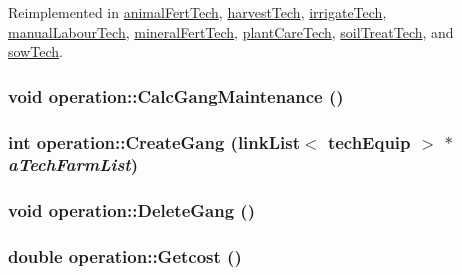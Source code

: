 Reimplemented in \hyperlink{classanimal_fert_tech_a44124a413ec4871546323878c2782380}{animalFertTech}, \hyperlink{classharvest_tech_a76ab6bbf21dabdf2dccc36bb5a632f9e}{harvestTech}, \hyperlink{classirrigate_tech_a936cb4d45c7ae68deaa04ce5d9397dbe}{irrigateTech}, \hyperlink{classmanual_labour_tech_a4947c755580db30ddaf817a7f7238600}{manualLabourTech}, \hyperlink{classmineral_fert_tech_a60aff267f8d7906833524bbd0edcc39b}{mineralFertTech}, \hyperlink{classplant_care_tech_a3d5338d71d9ef7b80859ac1576084d7f}{plantCareTech}, \hyperlink{classsoil_treat_tech_a8cb69be7b91ff19c7ced98d10d8a3ff5}{soilTreatTech}, and \hyperlink{classsow_tech_aec37925c5aa7d1ea82df758921c8fdc3}{sowTech}.\hypertarget{classoperation_a073d712fe9226371dc494e21312eb5c9}{
\subsubsection[{CalcGangMaintenance}]{\setlength{\rightskip}{0pt plus 5cm}void operation::CalcGangMaintenance ()}}
\label{classoperation_a073d712fe9226371dc494e21312eb5c9}
\hypertarget{classoperation_a43f0d435816474a618d0167b56a575c4}{
\subsubsection[{CreateGang}]{\setlength{\rightskip}{0pt plus 5cm}int operation::CreateGang ({\bf linkList}$<$ {\bf techEquip} $>$ $\ast$ {\em aTechFarmList})}}
\label{classoperation_a43f0d435816474a618d0167b56a575c4}
\hypertarget{classoperation_aee961be0d29d8cd2f78b94b813a26578}{
\subsubsection[{DeleteGang}]{\setlength{\rightskip}{0pt plus 5cm}void operation::DeleteGang ()}}
\label{classoperation_aee961be0d29d8cd2f78b94b813a26578}
\hypertarget{classoperation_ab1f5a26ae7907bdc4c093a99982aa8db}{
\subsubsection[{Getcost}]{\setlength{\rightskip}{0pt plus 5cm}double operation::Getcost ()}}
